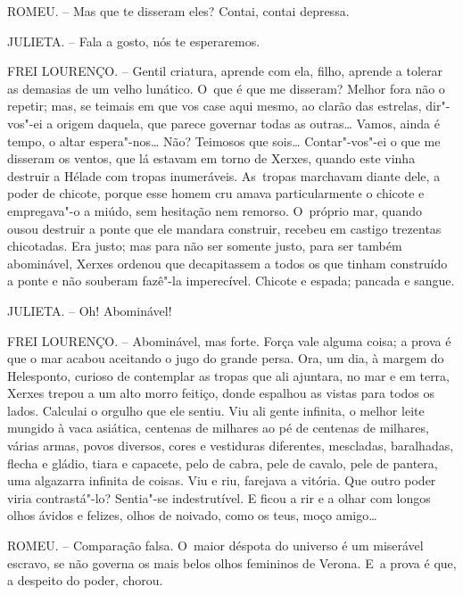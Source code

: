 ROMEU. -- Mas que te disseram eles? Contai, contai depressa.

JULIETA. -- Fala a gosto, nós te esperaremos.

FREI LOURENÇO. -- Gentil criatura, aprende com ela, filho, aprende a
tolerar as demasias de um velho lunático. O~que é que me disseram?
Melhor fora não o repetir; mas, se teimais em que vos case aqui mesmo,
ao clarão das estrelas, dir"-vos"-ei a origem daquela, que parece governar
todas as outras\ldots{} Vamos, ainda é tempo, o altar espera"-nos\ldots{} Não?
Teimosos que sois\ldots{} Contar"-vos"-ei o que me disseram os ventos, que lá
estavam em torno de Xerxes, quando este vinha destruir a Hélade com
tropas inumeráveis. As~tropas marchavam diante dele, a poder de chicote,
porque esse homem cru amava particularmente o chicote e empregava"-o a
miúdo, sem hesitação nem remorso. O~próprio mar, quando ousou destruir a
ponte que ele mandara construir, recebeu em castigo trezentas
chicotadas. Era justo; mas para não ser somente justo, para ser também
abominável, Xerxes ordenou que decapitassem a todos os que tinham
construído a ponte e não souberam fazê"-la imperecível. Chicote e espada;
pancada e sangue.

JULIETA. -- Oh! Abominável!

FREI LOURENÇO. -- Abominável, mas forte. Força vale alguma coisa; a
prova é que o mar acabou aceitando o jugo do grande persa. Ora, um dia,
à margem do Helesponto, curioso de contemplar as tropas que ali
ajuntara, no mar e em terra, Xerxes trepou a um alto morro feitiço,
donde espalhou as vistas para todos os lados. Calculai o orgulho que ele
sentiu. Viu ali gente infinita, o melhor leite mungido à vaca asiática,
centenas de milhares ao pé de centenas de milhares, várias armas, povos
diversos, cores e vestiduras diferentes, mescladas, baralhadas, flecha e
gládio, tiara e capacete, pelo de cabra, pele de cavalo, pele de
pantera, uma algazarra infinita de coisas. Viu e riu, farejava a
vitória. Que outro poder viria contrastá"-lo? Sentia"-se indestrutível. E
ficou a rir e a olhar com longos olhos ávidos e felizes, olhos de
noivado, como os teus, moço amigo\ldots{}

ROMEU. -- Comparação falsa. O~maior déspota do universo é um miserável
escravo, se não governa os mais belos olhos femininos de Verona. E~a
prova é que, a despeito do poder, chorou.

